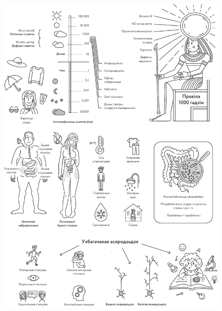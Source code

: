 \clearpage
\thispagestyle{empty}
\begin{figure}[htb!]
  \vspace*{-0.5in}
  \includegraphics[width=\textwidth]{willpower/ch12/full.pdf}  
\end{figure}
